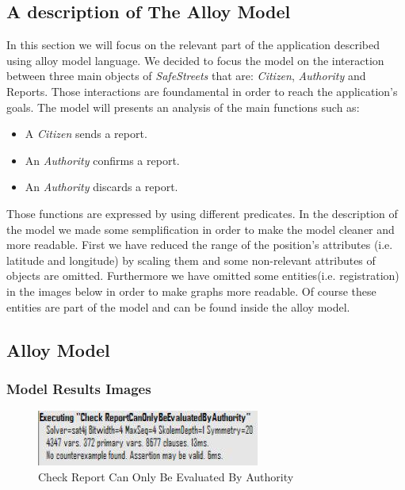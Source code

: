 \documentclass{article}
\begin{document}
\subsection{A description of The Alloy Model}
In this section we will focus on the relevant part of the application described
using alloy model language. We decided to
focus the model on the interaction between three main objects of 
\textit{SafeStreets} that are: \textit{Citizen}, \textit{Authority} and Reports. 
Those interactions are foundamental in order to reach the application's goals. 
The model will presents an analysis of the main functions such as:
\begin{itemize}
    \item A \textit{Citizen} sends a report. 
    \item An \textit{Authority} confirms a report. 
    \item An \textit{Authority} discards a report.
\end{itemize}
Those functions are expressed by using different predicates. In 
the description of the model we made some semplification in order to
make the model cleaner and more readable. First we have reduced the range
of the position's attributes (i.e. latitude and longitude) by scaling them and 
some non-relevant attributes of objects are omitted. Furthermore we have omitted
some entities(i.e. registration) in the images below in order to make graphs more readable.
Of course these entities are part of the model and can be found inside the alloy model.

\clearpage

\subsection{Alloy Model}


\clearpage

\subsubsection{Model Results Images}
\begin{figure}[H]
    \centering
    \includegraphics[scale=0.9]{img/alloy/check1.png}
    \caption{Check Report Can Only Be Evaluated By Authority} 
\end{figure}
\end{document}

